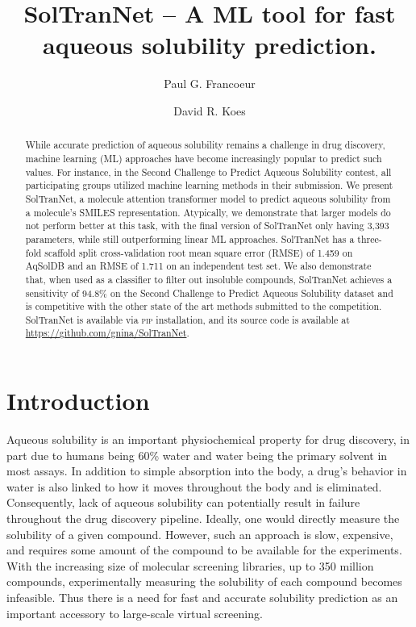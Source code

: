 \documentclass[journal=jmcmar,manuscript=article]{achemso}
\title{SolTranNet -- A ML tool for fast aqueous solubility prediction.}
\author{Paul G. Francoeur}
\author{David R. Koes}
\affiliation[Pitt]{Department of Computational and Systems Biology, University of Pittsburgh, Pittsburgh, PA 15260}
\begin{document}
\begin{abstract}
While accurate prediction of aqueous solubility remains a challenge in drug discovery, machine learning (ML) approaches have become increasingly popular to predict such values.
For instance, in the Second Challenge to Predict Aqueous Solubility contest, all participating groups utilized machine learning methods in their submission.
We present SolTranNet, a molecule attention transformer model to predict aqueous solubility from a molecule's SMILES representation.
Atypically, we demonstrate that larger models do not perform better at this task, with the final version of SolTranNet only having 3,393 parameters, while still outperforming linear ML approaches.
SolTranNet has a three-fold scaffold split cross-validation root mean square error (RMSE) of 1.459 on AqSolDB and an RMSE of 1.711 on an independent test set.
We also demonstrate that, when used as a classifier to filter out insoluble compounds, SolTranNet achieves a sensitivity of 94.8\% on the Second Challenge to Predict Aqueous Solubility dataset and is competitive with the other state of the art methods submitted to the competition.
SolTranNet is available via \textsc{pip} installation, and its source code is available at \url{https://github.com/gnina/SolTranNet}.

\end{abstract}


\section{Introduction}
Aqueous solubility is an important physiochemical property for drug discovery, in part due to humans being 60\% water\cite{HumanWater} and water being the primary solvent in most assays. 
In addition to simple absorption into the body, a drug's behavior in water is also linked to how it moves throughout the body and is eliminated.
Consequently, lack of aqueous solubility can potentially result in failure throughout the drug discovery pipeline.\cite{LIPINSKI1997,DI2006446,EKINS2002305}
Ideally, one would directly measure the solubility of a given compound.
However, such an approach is slow, expensive, and requires some amount of the compound to be available for the experiments.
With the increasing size of molecular screening libraries, up to 350 million compounds,\cite{NatureVS} experimentally measuring the solubility of each compound becomes infeasible.
Thus there is a need for fast and accurate solubility prediction as an important accessory to large-scale virtual screening.
\end{document}
